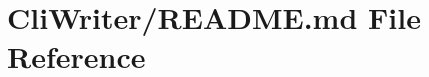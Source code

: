 \hypertarget{_r_e_a_d_m_e_8md}{}\section{Cli\+Writer/\+R\+E\+A\+D\+ME.md File Reference}
\label{_r_e_a_d_m_e_8md}
